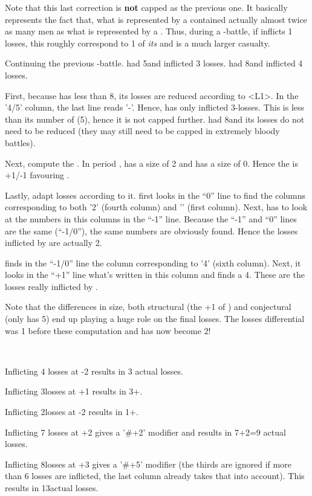 Note that this last correction is \textbf{not} capped as the previous one. It
basically represents the fact that, what is represented by a \TUR \LD
contained actually almost twice as many men as what is represented by a \HIS
\LD. Thus, during a \TUR-\HIS battle, if \TUR inflicts 1 losses, this roughly
correspond to 1 of \emph{its} \LD and is a much larger \HIS casualty.

\begin{exemple}
  Continuing the previous \FRA-\HIS battle. \HIS had 5\LD and inflicted 3
  losses. \FRA had 8\LD and inflicted 4 losses.

  First, because \HIS has less than 8\LD, its losses are reduced according to
  <L1>. In the '4/5\LD' column, the last line reads '-\texttd'. Hence, \HIS
  has only inflicted 3-\texttu losses. This is less than its number
  of \LD (5), hence it is not capped further. \FRA had 8\LD and its losses do
  not need to be reduced (they may still need to be capped in extremely bloody
  battles).

  Next, compute the . In period , \FRA
  has a size of 2 and \HIS has a size of 0. Hence the  is +1/-1 favouring \FRA.

  Lastly, adapt losses according to it. \HIS first looks in the ``0'' line to
  find the columns corresponding to both '2' (fourth column) and '\texttu'
  (first column). Next, \HIS has to look at the numbers in this columns in the
  ``-1'' line. Because the ``-1'' and ``0'' lines are the same (``-1/0''), the
  same numbers are obviously found. Hence the losses inflicted by \HIS are
  actually 2\texttu.

  \FRA finds in the ``-1/0'' line the column corresponding to '4' (sixth
  column). Next, it looks in the ``+1'' line what's written in this column and
  finds a 4\texttd. These are the losses really inflicted by \FRA.

  Note that the differences in size, both structural (the +1 of \FRA) and
  conjectural (\HIS only has 5\LD) end up playing a huge role on the final
  losses. The losses differential was 1 before these computation and has now
  become 2\texttu!
\end{exemple}

\begin{exemple}~

  Inflicting 4 losses at -2 results in 3 actual losses.

  Inflicting 3\texttd losses at +1 results in 3\texttd+\texttu.

  Inflicting 2\texttd losses at -2 results in 1\texttu+\texttd.

  Inflicting 7 losses at +2 gives a '\#+2' modifier and results in 7+2=9
  actual losses.

  Inflicting 8\texttu losses at +3 gives a '\#+5' modifier (the thirds are
  ignored if more than 6 losses are inflicted, the last column already takes
  that into account). This results in 13\texttu actual losses.
\end{exemple}

